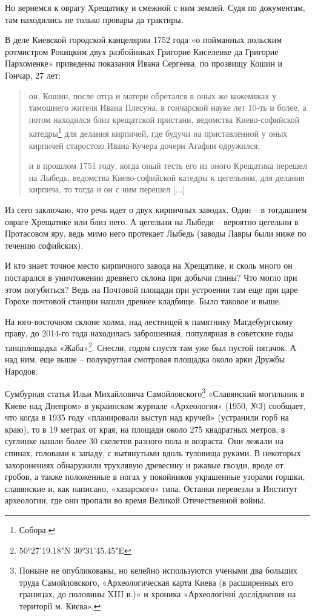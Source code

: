 Но вернемся к оврагу Хрещатику и смежной с ним землей. Судя по документам, там находились не только провары да трактиры.
 
В деле Киевской городской канцелярии 1752 года «о пойманных польским ротмистром Рокицким двух разбойниках Григорие Киселенке да Григорие Пархоменке» приведены показания Ивана Сергеева, по прозвищу Кошин и Гончар, 27 лет: 

\begin{quotation}
он, Кошин,  после отца и матери обретался в оных же кожемяках у тамошнего жителя Ивана Плесуна, в гончарской науке лет 10-ть и более, а потом находился близ крещатской пристани, ведомства Киево-софийской катедры\footnote{Собора.} для делания кирпичей, где будучи на приставленной у оных кирпичей старостою Ивана Кучера дочери Агафии одружился; 

и в прошлом 1751 году, когда оный тесть его из оного Крещатика перешел на Лыбедь, ведомства Киево-софийской катедры к цегельням, для делания кирпича, то тогда и он с ним перешел [...]
\end{quotation} 

Из сего заключаю, что речь идет о двух кирпичных заводах. Один – в тогдашнем овраге Хрещатике или близ него. А цегельни на Лыбеди – вероятно цегельни в Протасовом яру, ведь мимо него протекает Лыбедь (заводы Лавры были ниже по течению софийских).

И кто знает точное место кирпичного завода на Хрещатике, и сколь много он постарался в уничтожении древнего склона при добычи глины? Что могло при этом погубиться? Ведь на Почтовой площади при устроении там еще при царе Горохе почтовой станции нашли древнее кладбище. Было таковое и выше.

На юго-восточном склоне холма, над лестницей к памятнику Магдебургскому праву, до 2014-го года находилась заброшенная, популярная в советские годы танцплощадка «Жаба»\footnote{50°27'19.18"N 30°31'45.45"E}. Снесли, годом спустя там уже был пустой пятачок. А над ним, еще выше – полукруглая смотровая площадка около арки Дружбы Народов. 

Сумбурная статья Ильи Михайловича Самойловского\footnote{Поныне не опубликованы, но келейно используются учеными два больших труда Самойловского, «Археологическая карта Киева (в расширенных его границах, до половины XIII в.)» и хроника «Археологічні дослідження на території м. Києва».} «Славянский могильник в Киеве над Днепром» в украинском журнале «Археология» (1950, №3) сообщает, что когда в 1935 году «планировали выступ над кручей» (устранили горб на краю), то в 19 метрах от края, на площади около 275 квадратных метров, в суглинке нашли более 30 скелетов разного пола и возраста. Они лежали на спинах, головами к западу, с вытянутыми вдоль туловища руками. В некоторых захоронениях обнаружили трухлявую древесину и ржавые гвозди, вроде от гробов, а также положенные в ногах у покойников украшенные узорами горшки, славянские и, как написано, «хазарского» типа. Останки перевезли в Институт археологии, где они пропали во время Великой Отечественной войны.


